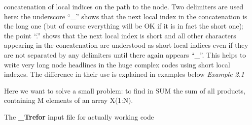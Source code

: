 \itemitem{::$=$} concatenation of local indices on the path to the node.
            Two delimiters are used here:
            the underscore ``\_'' shows that the next local index in the
            concatenation is the long one (but of course everything
            will be OK if it is in fact the short one);
            the point ``.'' shows that the next local index is short
            and all other characters appearing in the concatenation
            are understood as short local indices even if they are
            not separated by any delimiters until there again appears
            ``\_''. This helps to write very long node headlines
            in the huge complex codes using short local indexes.
            The difference in their use is explained in examples
            below
\smallskip
{\it Example 2.1}

\par\noindent Here we want to solve a small problem: to find in SUM
the sum of all products, containing M elements of an array X(1:N).

\par\noindent The {\bf \_Trefor} input file for actually working code

